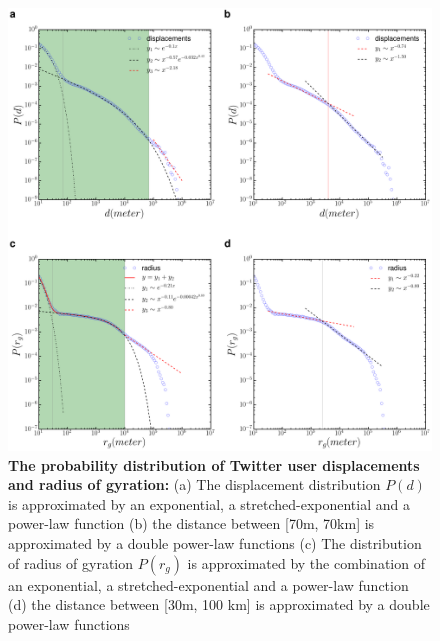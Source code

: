 \documentclass[]{tGIS2e}
\begin{document}
{\begin{figure}[ht]
\includegraphics[width=1.0\linewidth]{./figure/S4_radius_displacement}
\caption{{\bf The probability distribution of Twitter user displacements and radius of gyration:} (a) The displacement distribution $P(d)$ is approximated by an exponential, a stretched-exponential and a power-law function (b) the distance between [70m, 70km] is approximated by a double power-law functions (c) The distribution of radius of gyration $P(r_g)$ is approximated by the combination of an exponential, a stretched-exponential and a power-law function (d) the distance between [30m, 100 km] is approximated by a double power-law functions}
\label{S4_Fig}
\end{figure}

}
\end{document}
